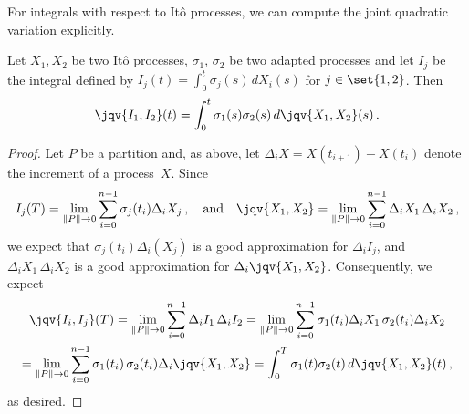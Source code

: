For integrals with respect to It\^o processes, we can compute the joint quadratic variation explicitly.
\begin{proposition}
  Let $X_1, X_2$ be two It\^o processes, $\sigma_1$, $\sigma_2$ be two adapted processes and let $I_j$ be the integral defined by $I_j(t) = \int_0^t \sigma_j(s) \, d X_i(s)$ for $j \in \set{1, 2}$.
  Then
  \begin{equation*}
    \jqv{I_1, I_2}(t) = \int_0^t \sigma_1(s) \sigma_2(s) \, d\jqv{X_1, X_2}(s) \,.
  \end{equation*}
\end{proposition}
\begin{proof}
  Let $P$ be a partition and, as above, let $\Delta_i X = X(t_{i+1}) - X(t_i)$ denote the increment of a process~$X$.
  Since
  \begin{equation*}
    I_j(T) = \lim_{\norm{P} \to 0} \sum_{i=0}^{n-1}
      \sigma_j(t_i) \Delta_i X_j\,,
    \quad\text{and}\quad
    \jqv{X_1, X_2} = \lim_{\norm{P} \to 0} \sum_{i=0}^{n-1}
      \Delta_i X_1\, \Delta_i X_2\,,
  \end{equation*}
  we expect that $\sigma_j(t_i) \Delta_i(X_j)$ is a good approximation for $\Delta_i I_j$,
  and $\Delta_i X_1 \, \Delta_i X_2$ is a good approximation for $\Delta_i \jqv{X_1, X_2}$.
  Consequently, we expect
  \begin{multline*}
    \jqv{I_i, I_j}(T)
      = \lim_{\norm{P} \to 0} \sum_{i=0}^{n-1} \Delta_i I_1 \, \Delta_i I_2
      = \lim_{\norm{P} \to 0}
	  \sum_{i=0}^{n-1} \sigma_1(t_i) \Delta_i X_1 \, \sigma_2(t_i) \Delta_i X_2
    \\
      = \lim_{\norm{P} \to 0}
	  \sum_{i=0}^{n-1}
	    \sigma_1(t_i) \, \sigma_2(t_i)
	    \Delta_i \jqv{X_1, X_2}
      = \int_0^T \sigma_1(t) \sigma_2(t) \, d\jqv{X_1, X_2}(t) \,,
  \end{multline*}
  as desired.
\end{proof}

